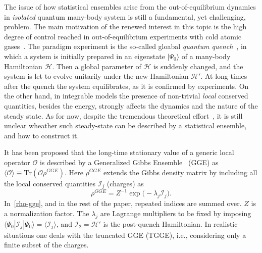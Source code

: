 \documentclass[twocolumn,superscriptaddress,prb,10pt]{revtex4-1}
\begin{document}
The issue of how statistical ensembles arise from the out-of-equilibrium 
dynamics in {\it isolated} quantum many-body system is still a fundamental, 
yet challenging, problem. The main motivation of the renewed interest 
in this topic is the high degree of control reached in out-of-equilibrium 
experiments with cold atomic gases~\cite{bloch-2008,greiner-2002,kinoshita-2006,
hofferberth-2007,trotzky-2012,gring-2012,cheneau-2012,
schneider-2012,kunhert-2013,langen-2013,meinert-2013,fukuhara-2013,
ronzheimer-2013,braun-2014,langen-2015}. The paradigm experiment is the so-called gloabal 
{\it quantum quench}~\cite{polkovnikov-2011}, in which a system is initially 
prepared in an eigenstate $|\Psi_0\rangle$ of a many-body Hamiltonian ${\mathcal 
H}$. Then a global parameter of ${\mathcal H}$ is suddenly changed, and the 
system is let to evolve unitarily under the new Hamiltonian ${\mathcal H}'$. 
At long times after the quench the system equilibrates, as it is confirmed by 
experiments. On the other hand, in integrable models the 
presence of non-trivial {\it local} conserved quantities, besides the energy, 
strongly affects the dynamics and the nature of the steady state. As for now,  
despite the tremendous theoretical effort~\cite{calabrese-2006,rigol-2007,calabrese-2007,
kollath-2007,manmana-2007,rigol-2008,cramer-2008,barthel-2008,kollar-2008,moeckel-2008,
iucci-2009,rossini-2009,barmettler-2009,biroli-2010,rossini-2010,fioretto-2010,
gogolin-2011,banuls-2011,calabrese-2011,rigol-2011,calabrese-2012,caux-2012,essler-2012,
cazalilla-2012,mossel-2012a,collura-2013,mussardo-2013,caux-2013,fagotti-2013,sotiriadis-2014,
fagotti-2014,essler-2014,goldstein-2014,de-nardis-2014,wright-2014,pozsgay-2014,wouters-2014,
mestyian-2015}, 
it is still unclear wheather such steady-state can be described by a statistical ensemble, 
and how to construct it. 

It has been proposed that the long-time stationary value of a generic 
local operator ${\mathcal O}$ is described by a Generalized Gibbs Ensemble~\cite{
rigol-2007,rigol-2008} (GGE) as $\langle{\mathcal O}\rangle\equiv\textrm{Tr}({\mathcal O}
\rho^{GGE})$. Here $\rho^{GGE}$ extends the Gibbs density matrix by including  all 
the local conserved quantities $ {\mathcal I}_j$ (charges) as 
%
\begin{equation}
\rho^{GGE}=Z^{-1}\exp\big(-\lambda_j{\mathcal I}_j\big). 
\label{rho-gge}
\end{equation}
%
In~\eqref{rho-gge}, and in the rest of the paper, repeated indices are summed over. 
$Z$ is a normalization factor. The $\lambda_j$ are Lagrange multipliers to be fixed 
by imposing $\langle\Psi_0|{\mathcal I}_j|\Psi_0\rangle=\langle{\mathcal 
I}_j\rangle$, and ${\mathcal I}_2={\mathcal H}'$ is the post-quench Hamiltonian. 
In realistic situations one deals with the truncated GGE (TGGE), i.e., considering 
only a finite subset of the charges. 
\end{document}
